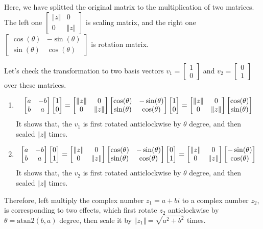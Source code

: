 \documentclass[runningheads,a4paper,english]{llncs}[2022/01/12]
\newcommand{\Clen}[1]{\Vert #1\Vert}
\newcommand{\bmatL}{\begin{bmatrix}}
\newcommand{\bmatR}{\end{bmatrix}}
\begin{document}
Here, we have splitted the original matrix to the multiplication of two matrices.
The left one $\bmatL \Clen{z}&0\\0&\Clen{z}\bmatR $ is scaling matrix,
and the right one $\bmatL\cos(\theta)&-\sin(\theta)\\\sin(\theta)&\cos(\theta)\bmatR $ is rotation matrix.

Let's check the transformation to two basis vectors $v_1=\bmatL 1\\0\bmatR $ and $v_2=\bmatL 0\\1\bmatR $ over these matrices.

\begin{enumerate}[(1)]
\item
  \begin{equation}
    \bmatL a&-b\\b&a\bmatR \bmatL 1\\0\bmatR 
    =\bmatL \Clen{z}&0\\0&\Clen{z}\bmatR \bmatL \cos(\theta)&-\sin(\theta)\\\sin(\theta)&\cos(\theta)\bmatR \bmatL 1\\0\bmatR
    =\bmatL \Clen{z}&0\\0&\Clen{z}\bmatR \bmatL \cos(\theta)\\\sin(\theta)\bmatR\\
  \end{equation}
  It shows that, the $v_1$ is first rotated anticlockwise by $\theta$ degree, and then scaled $\Clen{z}$ times.
\item
  \begin{equation}
    \bmatL a&-b\\b&a\bmatR \bmatL 0\\1\bmatR 
    =\bmatL \Clen{z}&0\\0&\Clen{z}\bmatR \bmatL \cos(\theta)&-\sin(\theta)\\\sin(\theta)&\cos(\theta)\bmatR \bmatL 0\\1\bmatR
    =\bmatL \Clen{z}&0\\0&\Clen{z}\bmatR \bmatL -\sin(\theta)\\\cos(\theta)\bmatR\\
  \end{equation}
  It shows that, the $v_2$ is first rotated anticlockwise by $\theta$ degree, and then scaled $\Clen{z}$ times.
\end{enumerate}

Therefore, left multiply the complex number $z_1=a+bi$ to a complex number $z_2$, is corresponding to two effects, which first rotate $z_2$ anticlockwise by $\theta=\mathrm{atan2}(b,a)$ degree, then scale it by $\Clen{z_1}=\sqrt{a^2+b^2}$ times.
\end{document}
